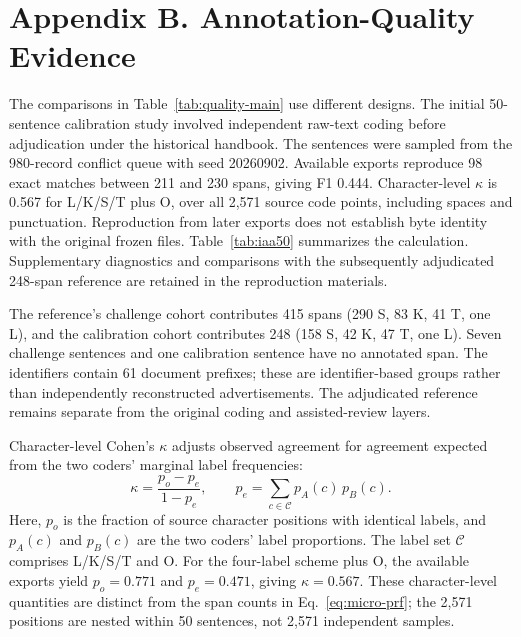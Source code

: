 \section{Appendix B. Annotation-Quality Evidence}
\label{app:b}
\label{sec:quality-provenance-r12}
The comparisons in Table~\ref{tab:quality-main} use different designs. The initial 50-sentence calibration study involved independent raw-text coding before adjudication under the historical handbook. The sentences were sampled from the 980-record conflict queue with seed 20260902. Available exports reproduce 98 exact matches between 211 and 230 spans, giving F1 0.444. Character-level $\kappa$ is 0.567 for L/K/S/T plus O, over all 2,571 source code points, including spaces and punctuation. Reproduction from later exports does not establish byte identity with the original frozen files. Table~\ref{tab:iaa50} summarizes the calculation. Supplementary diagnostics and comparisons with the subsequently adjudicated 248-span reference are retained in the reproduction materials.

The reference's challenge cohort contributes 415 spans (290 S, 83 K, 41 T, one L), and the calibration cohort contributes 248 (158 S, 42 K, 47 T, one L). Seven challenge sentences and one calibration sentence have no annotated span. The identifiers contain 61 document prefixes; these are identifier-based groups rather than independently reconstructed advertisements. The adjudicated reference remains separate from the original coding and assisted-review layers.

Character-level Cohen's $\kappa$ adjusts observed agreement for agreement expected from the two coders' marginal label frequencies:
\begin{equation}
\kappa=\frac{p_o-p_e}{1-p_e},
\qquad p_e=\sum_{c\in\mathcal{C}}p_A(c)\,p_B(c).
\label{eq:character-kappa}
\end{equation}
Here, $p_o$ is the fraction of source character positions with identical labels, and $p_A(c)$ and $p_B(c)$ are the two coders' label proportions. The label set $\mathcal{C}$ comprises L/K/S/T and O. For the four-label scheme plus O, the available exports yield $p_o=0.771$ and $p_e=0.471$, giving $\kappa=0.567$. These character-level quantities are distinct from the span counts in Eq.~\eqref{eq:micro-prf}; the 2,571 positions are nested within 50 sentences, not 2,571 independent samples.

